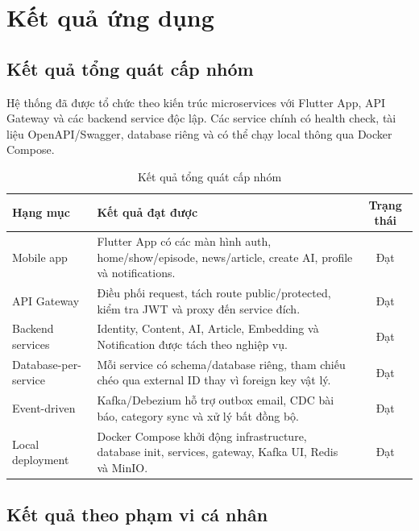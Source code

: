 \documentclass[14pt,a4paper,oneside]{extreport}
\begin{document}
\section{Kết quả ứng dụng}
\label{sec:ket-qua-ung-dung}

\subsection{Kết quả tổng quát cấp nhóm}

Hệ thống đã được tổ chức theo kiến trúc microservices với Flutter App, API Gateway và các backend service độc lập. Các service chính có health check, tài liệu OpenAPI/Swagger, database riêng và có thể chạy local thông qua Docker Compose.

\begin{table}[H]
\centering
\caption{Kết quả tổng quát cấp nhóm}
\label{tab:ket-qua-tong-quat}
\renewcommand{\arraystretch}{1.3}
\small
\begin{tabularx}{\textwidth}{|l|X|c|}
\hline
\textbf{Hạng mục} & \textbf{Kết quả đạt được} & \textbf{Trạng thái} \\
\hline
Mobile app & Flutter App có các màn hình auth, home/show/episode, news/article, create AI, profile và notifications. & Đạt \\
\hline
API Gateway & Điều phối request, tách route public/protected, kiểm tra JWT và proxy đến service đích. & Đạt \\
\hline
Backend services & Identity, Content, AI, Article, Embedding và Notification được tách theo nghiệp vụ. & Đạt \\
\hline
Database-per-service & Mỗi service có schema/database riêng, tham chiếu chéo qua external ID thay vì foreign key vật lý. & Đạt \\
\hline
Event-driven & Kafka/Debezium hỗ trợ outbox email, CDC bài báo, category sync và xử lý bất đồng bộ. & Đạt \\
\hline
Local deployment & Docker Compose khởi động infrastructure, database init, services, gateway, Kafka UI, Redis và MinIO. & Đạt \\
\hline
\end{tabularx}
\end{table}

\subsection{Kết quả theo phạm vi cá nhân}
\end{document}
